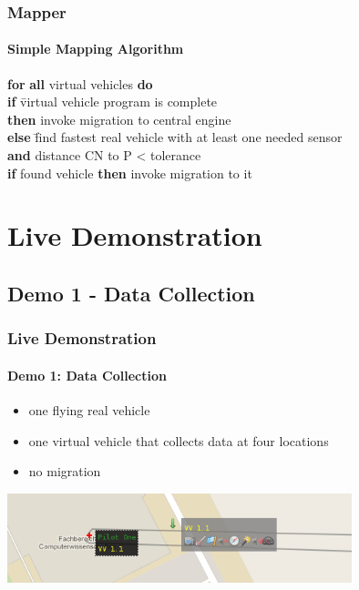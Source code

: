 \documentclass{beamer}
\begin{document}
\begin{frame}\frametitle{Mapper}\framesubtitle{Simple Mapping Algorithm}
	\begin{tabbing}
	\textbf{for} \= \textbf{all} virtual vehicles \textbf{do} \\[.25cm]
	\> \textbf{if}  \= virtual vehicle program is complete \\
	\> \>	\textbf{then} invoke migration to central engine \\[.25cm]
	\>	\textbf{else} \= find fastest real vehicle with at least one needed sensor \\
	\> \>	\textbf{and} distance CN to P < tolerance \\[.25cm]
	\>	\textbf{if} found vehicle \textbf{then} invoke migration to it \\
	\end{tabbing}
\end{frame}

\section{Live Demonstration}
\subsection{Demo 1 - Data Collection}

\begin{frame}\frametitle{Live Demonstration}\framesubtitle{Demo 1: Data Collection}
	\begin{itemize}
		\item one flying real vehicle
		\item one virtual vehicle that collects data at four locations
		\item no migration
	\end{itemize}
	\vspace{0.5cm}
	\begin{center}
		{\includegraphics[width=10cm]{demo1.png}}
	\end{center}
\end{frame}
\end{document}
